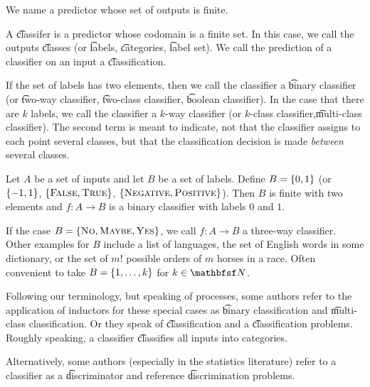 
We name a predictor whose set of outputs is finite.

A \t{classifer} is a predictor whose codomain is a finite set.
In this case, we call the outputs \t{classes} (or \t{labels}, \t{categories}, \t{label set}).
We call the prediction of a classifier on an input a \t{classification}.

If the set of labels has two elements, then we call the classifier a \t{binary classifier} (or \t{two-way classifier}, \t{two-class classifier}, \t{boolean classifier}).
In the case that there are $k$ labels, we call the classifier a \t{$k$-way classifier} (or \t{$k$-class classifier},\t{multi-class classifier}).
The second term is meant to indicate, not that the classifier assigns to each point several classes, but that the classification decision is made \textit{between} several classes.

Let $A$ be a set of inputs and let $B$ be a set of labels.
Define $B = \{0, 1\}$ (or $\{-1,1 \}$, $\{\textsc{False}, \textsc{True}\}$, $\{\textsc{Negative}, \textsc{Positive}\}$).
Then $B$ is finite with two elements and $f: A \to B$ is a binary classifier with labels $0$ and $1$.

If the case $B = \{\text{\textsc{No}}, \textsc{Maybe}, \textsc{Yes}\}$, we call $f: A \to B$ a three-way classifier.
Other examples for $B$ include a list of languages, the set of English words in some dictionary, or the set of $m!$ possible orders of $m$ horses in a race.
Often convenient to take $B = \{1, \dots , k\}$ for $k \in \N $.

Following our terminology, but speaking of processes, some authors refer to the application of inductors for these special cases as \t{binary classification} and \t{multi-class classification}.
Or they speak of \t{classification} and a \t{classification problems}.
Roughly speaking, a classifier \t{classifies} all inputs into categories.

Alternatively, some authors (especially in the statistics literature) refer to a classifier as a \t{discriminator} and reference \t{discrimination problems}.
